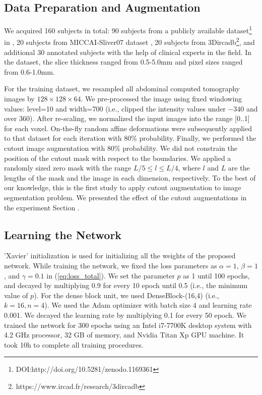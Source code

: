 \documentclass[journal]{IEEEtran}
\begin{document}
\subsection{Data Preparation and Augmentation}
We acquired 160 subjects in total: 90 subjects from a publicly available dataset\footnote{DOI:http://doi.org/10.5281/zenodo.1169361} in \cite{gibson2018automatic}, 20 subjects from MICCAI-Sliver07 dataset \cite{heimann2009comparison}, 20 subjects from 3Dircadb\footnote{https://www.ircad.fr/research/3dircadb}, and additional 30 annotated subjects with the help of clinical experts in the field. In the dataset, the slice thickness ranged from 0.5-5.0mm and pixel sizes ranged from 0.6-1.0mm.\par
For the training dataset, we resampled all abdominal computed tomography images by $128\times128\times64$. We pre-processed the image using fixed windowing values: level=10 and width=700 (i.e., clipped the intensity values under $-340$ and over $360$). After re-scaling, we normalized the input images into the range [0..1] for each voxel. On-the-fly random affine deformations were subsequently applied to that dataset for each iteration with 80\% probability. Finally, we performed the cutout image augmentation \cite{devries2017improved} with 80\% probability. We did not constrain the position of the cutout mask with respect to the boundaries. We applied a randomly sized zero mask with the range \(L/5\leq l \leq L/4\), where \(l\) and \(L\) are the lengths of the mask and the image in each dimension, respectively. To the best of our knowledge, this is the first study to apply cutout \cite{devries2017improved} augmentation to image segmentation problem. We presented the effect of the cutout augmentations in the experiment Section .

\subsection{Learning the Network}
'Xavier' initialization \cite{glorot2010understanding} is used for initializing all the weights of the proposed network. While training the network, we fixed the loss parameters as \(\alpha=1\), \(\beta=1\), and \(\gamma=0.1\) in (\ref{eq:loss_total}). We set the parameter \(p\) as 1 until 100 epochs, and decayed by multiplying 0.9 for every 10 epoch until 0.5 (i.e., the minimum value of \(p\)). For the dense block unit, we used DenseBlock-(16,4) (i.e., \(k=16, n=4\)). We used the Adam optimizer with batch size 4 and learning rate 0.001. We decayed the learning rate by multiplying 0.1 for every 50 epoch. We trained the network for 300 epochs using an Intel i7-7700K desktop system with 4.2 GHz processor, 32 GB of memory, and Nvidia Titan Xp GPU machine. It took 10h to complete all training procedures.
\par
\end{document}
